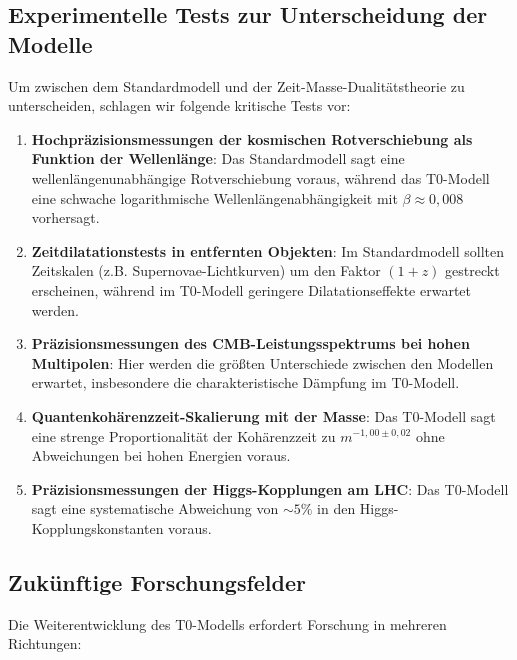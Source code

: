 \documentclass{article}
\theoremstyle{definition}
\theoremstyle{remark}
\begin{document}
		\subsection{Experimentelle Tests zur Unterscheidung der Modelle}
		
		Um zwischen dem Standardmodell und der Zeit-Masse-Dualitätstheorie zu unterscheiden, schlagen wir folgende kritische Tests vor:
		
		\begin{enumerate}
			\item \textbf{Hochpräzisionsmessungen der kosmischen Rotverschiebung als Funktion der Wellenlänge}: Das Standardmodell sagt eine wellenlängenunabhängige Rotverschiebung voraus, während das T0-Modell eine schwache logarithmische Wellenlängenabhängigkeit mit $\beta \approx 0,008$ vorhersagt.
			
			\item \textbf{Zeitdilatationstests in entfernten Objekten}: Im Standardmodell sollten Zeitskalen (z.B. Supernovae-Lichtkurven) um den Faktor $(1+z)$ gestreckt erscheinen, während im T0-Modell geringere Dilatationseffekte erwartet werden.

	\item \textbf{Präzisionsmessungen des CMB-Leistungsspektrums bei hohen Multipolen}: Hier werden die größten Unterschiede zwischen den Modellen erwartet, insbesondere die charakteristische Dämpfung im T0-Modell.
	
	\item \textbf{Quantenkohärenzzeit-Skalierung mit der Masse}: Das T0-Modell sagt eine strenge Proportionalität der Kohärenzzeit zu $m^{-1,00 \pm 0,02}$ ohne Abweichungen bei hohen Energien voraus.
	
	\item \textbf{Präzisionsmessungen der Higgs-Kopplungen am LHC}: Das T0-Modell sagt eine systematische Abweichung von $\sim 5\%$ in den Higgs-Kopplungskonstanten voraus.
\end{enumerate}

\subsection{Zukünftige Forschungsfelder}

Die Weiterentwicklung des T0-Modells erfordert Forschung in mehreren Richtungen:
\end{document}
